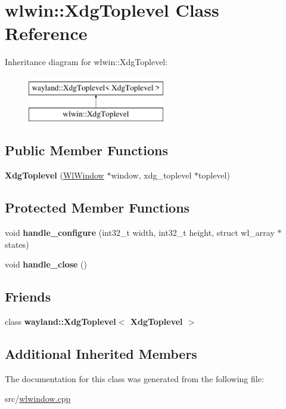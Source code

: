 \hypertarget{classwlwin_1_1XdgToplevel}{}\section{wlwin\+::Xdg\+Toplevel Class Reference}
\label{classwlwin_1_1XdgToplevel}
Inheritance diagram for wlwin\+::Xdg\+Toplevel\+:\begin{figure}[H]
\begin{center}
\leavevmode
\includegraphics[height=2.000000cm]{classwlwin_1_1XdgToplevel}
\end{center}
\end{figure}
\subsection*{Public Member Functions}
\begin{DoxyCompactItemize}
\item 
\mbox{\label{classwlwin_1_1XdgToplevel_acb56d9105277c9a6a7ee0797b4815bac}} 
{\bfseries Xdg\+Toplevel} (\mbox{\hyperlink{classwlwin_1_1WlWindow}{Wl\+Window}} $\ast$window, xdg\+\_\+toplevel $\ast$toplevel)
\end{DoxyCompactItemize}
\subsection*{Protected Member Functions}
\begin{DoxyCompactItemize}
\item 
\mbox{\label{classwlwin_1_1XdgToplevel_a18f0d882cb0d5aea86dc9398ef709efd}} 
void {\bfseries handle\+\_\+configure} (int32\+\_\+t width, int32\+\_\+t height, struct wl\+\_\+array $\ast$states)
\item 
\mbox{\label{classwlwin_1_1XdgToplevel_a012ee36a56fccb4fcaf93de786fe2b92}} 
void {\bfseries handle\+\_\+close} ()
\end{DoxyCompactItemize}
\subsection*{Friends}
\begin{DoxyCompactItemize}
\item 
\mbox{\label{classwlwin_1_1XdgToplevel_ad978e0ebc3ffb165f58743abe154e696}} 
class {\bfseries wayland\+::\+Xdg\+Toplevel$<$ Xdg\+Toplevel $>$}
\end{DoxyCompactItemize}
\subsection*{Additional Inherited Members}


The documentation for this class was generated from the following file\+:\begin{DoxyCompactItemize}
\item 
src/\mbox{\hyperlink{wlwindow_8cpp}{wlwindow.\+cpp}}\end{DoxyCompactItemize}
